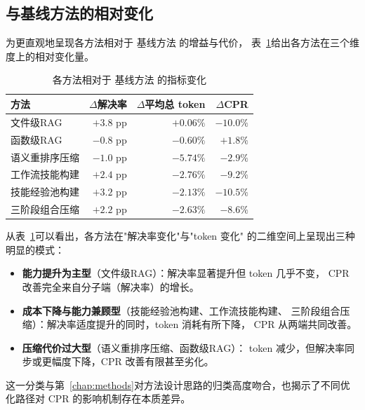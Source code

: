 \subsection{与基线方法的相对变化}
\label{subsec:relative-change}

为更直观地呈现各方法相对于 基线方法 的增益与代价，
表~\ref{tab:relative-change}给出各方法在三个维度上的相对变化量。

\begin{table}[htbp]
  \centering
  \caption{各方法相对于 基线方法 的指标变化}
  \label{tab:relative-change}
  \begin{tabular}{lrrr}
    \toprule
    方法 & $\Delta$解决率 & $\Delta$平均总 token & $\Delta$CPR \\
    \midrule
    文件级RAG           & $+3.8$ pp & $+0.06\%$ & $-10.0\%$ \\
    函数级RAG       & $-0.8$ pp & $-0.60\%$ & $+1.8\%$  \\
    语义重排序压缩 & $-1.0$ pp & $-5.74\%$ & $-2.9\%$  \\
    工作流技能构建  & $+2.4$ pp & $-2.76\%$ & $-9.2\%$  \\
    技能经验池构建   & $+3.2$ pp & $-2.13\%$ & $-10.5\%$ \\
    三阶段组合压缩   & $+2.2$ pp & $-2.63\%$ & $-8.6\%$  \\
    \bottomrule
  \end{tabular}
\end{table}

从表~\ref{tab:relative-change}可以看出，各方法在"解决率变化"与"token 变化"
的二维空间上呈现出三种明显的模式：

\begin{itemize}
  \item \textbf{能力提升为主型}（文件级RAG）：解决率显著提升但 token 几乎不变，
        CPR 改善完全来自分子端（解决率）的增长。
  \item \textbf{成本下降与能力兼顾型}（技能经验池构建、工作流技能构建、
        三阶段组合压缩）：解决率适度提升的同时，token 消耗有所下降，
        CPR 从两端共同改善。
  \item \textbf{压缩代价过大型}（语义重排序压缩、函数级RAG）：
        token 减少，但解决率同步或更幅度下降，CPR 改善有限甚至劣化。
\end{itemize}

这一分类与第~\ref{chap:methods}对方法设计思路的归类高度吻合，也揭示了不同优化路径对 CPR 的影响机制存在本质差异。


